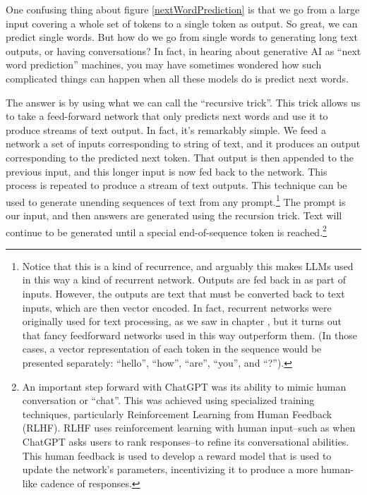 One confusing thing about figure \ref{nextWordPrediction} is that we go from a large input covering a whole set of tokens to a single token as output. So great, we can predict single words. But how do we go from single words to generating long text outputs, or having conversations? In fact, in hearing about generative AI as ``next word prediction'' machines, you may have sometimes wondered how such complicated things can happen when all these models do is predict next words.

The answer is by using what we can call the ``recursive trick''. This trick allows us to take a feed-forward network that only predicts next words and use it to produce streams of text output. In fact, it's remarkably simple. We feed a network a set of inputs corresponding to string of text, and it produces an output corresponding to the predicted next token. That output is then appended to the previous input, and this longer input is now fed back to the network. This process is repeated to produce a stream of text outputs. This technique can be used to generate unending sequences of text from any prompt.\footnote{Notice that this is a kind of recurrence, and arguably this makes LLMs used in this way a kind of recurrent network. Outputs are fed back in as part of inputs. However, the outputs are text that must be converted back to text inputs, which are then vector encoded. In fact, recurrent networks were originally used for text processing, as we saw in chapter , but it turns out that fancy feedforward networks used in this way outperform them. (In those cases, a vector representation of each token in the sequence would be presented separately: ``hello'', ``how'', ``are'', ``you'', and ``?'').} The prompt is our input, and then answers are generated using the recursion trick. Text will continue to be generated until a special end-of-sequence token is reached.\footnote{An important step forward with ChatGPT was its ability to mimic human conversation or ``chat''. This was achieved using specialized training techniques, particularly Reinforcement Learning from Human Feedback (RLHF). RLHF uses reinforcement learning with human input--such as when ChatGPT asks users to rank responses--to refine its conversational abilities.  This human feedback is used to develop a reward model that is used to update the network’s parameters, incentivizing it to produce a more human-like cadence of responses.} 

